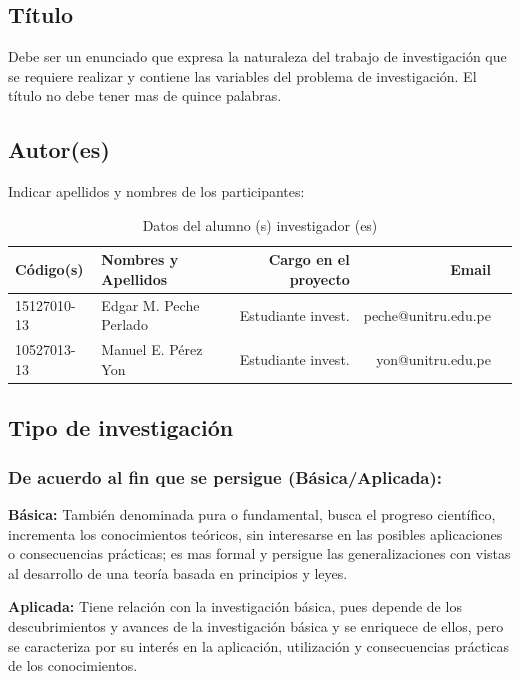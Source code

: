 \documentclass[a4paper, 12pt]{article}
\begin{document}
\subsection{Título}
Debe ser un enunciado que expresa la naturaleza del trabajo de investigación que se requiere realizar  y contiene las variables del problema de investigación. El título no debe tener mas de quince palabras.

\subsection{Autor(es)}
Indicar apellidos y nombres de los participantes:
\begin{table}[h!]
 \caption{\small{Datos del alumno (s) investigador (es)}}
\begin{tabular}{llrrr} \toprule
{\bf Código(s)} & {\bf Nombres y Apellidos} & {\bf Cargo en el proyecto} & {\bf Email} \\ \midrule
15127010-13 & Edgar M. Peche Perlado & Estudiante invest. & peche@unitru.edu.pe           \\
10527013-13    & Manuel E. Pérez Yon & Estudiante invest. & yon@unitru.edu.pe            \\ \bottomrule
\end{tabular}
\end{table}



\subsection{Tipo de investigación}
\subsubsection{De acuerdo al fin que se persigue (Básica/Aplicada):} 

{\bf Básica:} También denominada pura o fundamental, busca el progreso científico, incrementa los conocimientos teóricos, sin interesarse en las posibles aplicaciones o consecuencias prácticas; es mas formal y persigue las generalizaciones con vistas al desarrollo de una teoría basada  en principios y leyes.\par
\vskip 0.3cm
{\bf Aplicada:} Tiene relación con la investigación básica, pues depende de los descubrimientos y avances de la investigación básica y se enriquece de ellos, pero se caracteriza por su interés en la aplicación, utilización y consecuencias prácticas de los conocimientos. 
                
\end{document}
